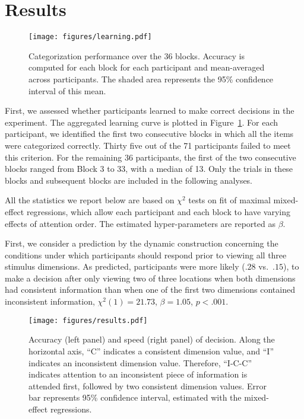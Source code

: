 \documentclass[man,floatsintext]{apa6}
\begin{document}
\section{Results}

\begin{figure}[t]
    \centering
    \texttt{[image: figures/learning.pdf]}

    \caption{Categorization performance over the 36 blocks. Accuracy is computed for each block for
        each participant and mean-averaged across participants. The shaded area represents the 95\%
    confidence interval of this mean.}

\label{fig:learning}
\end{figure}

First, we assessed whether participants learned to make correct decisions in the experiment. The
aggregated learning curve is plotted in Figure~\ref{fig:learning}. For each participant,
we identified the first two consecutive blocks in which all the items were categorized
correctly.  Thirty five out of the 71 participants failed to meet this criterion. For the remaining
36 participants, the first of the two consecutive blocks ranged from Block 3 to 33, with a median of
13. Only the trials in these blocks and subsequent blocks are included in the following analyses.

All the statistics we report below are based on $\chi^{2}$ tests on fit of maximal mixed-effect
regressions, which allow each participant and each block to have varying effects of attention order.
The estimated hyper-parameters are reported as $\beta$.


First, we consider a prediction by the dynamic construction concerning the conditions under which
participants should respond prior to viewing all three stimulus dimensions. As predicted,
participants were more likely ($.28$ vs.\ $.15$), to make a decision after only viewing two of three
locations when both dimensions had consistent information than when one of the first two dimensions
contained inconsistent information, $\chi^{2}(1)=21.73$, $\beta=1.05$, $p<.001$.

\begin{figure}[t]
    \centering
    \texttt{[image: figures/results.pdf]}

    \caption{Accuracy (left panel) and speed (right panel) of decision. Along the horizontal axis,
    ``C'' indicates a consistent dimension value, and ``I'' indicates an inconsistent dimension
    value.  Therefore, ``I-C-C'' indicates attention to an inconsistent piece of information is
    attended first, followed by two consistent dimension values. Error bar represents 95\%
    confidence interval, estimated with the mixed-effect regressions.}

\label{fig:results}
\end{figure}
\end{document}

